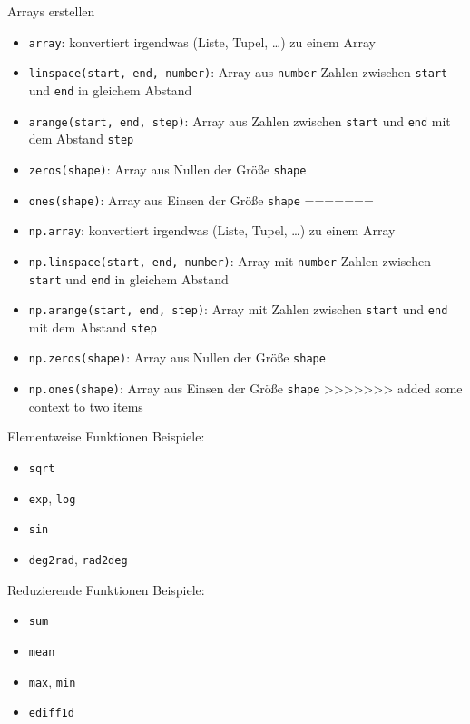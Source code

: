 \begin{frame}{Arrays erstellen}
  \begin{itemize}
    \item \texttt{array}: konvertiert irgendwas (Liste, Tupel, …) zu einem Array
    \item \texttt{linspace(start, end, number)}: Array aus \texttt{number} Zahlen zwischen \texttt{start} und \texttt{end} in gleichem Abstand
    \item \texttt{arange(start, end, step)}: Array aus Zahlen zwischen \texttt{start} und \texttt{end} mit dem Abstand \texttt{step}
    \item \texttt{zeros(shape)}: Array aus Nullen der Größe \texttt{shape}
    \item \texttt{ones(shape)}: Array aus Einsen der Größe \texttt{shape}
=======
    \item \texttt{np.array}: konvertiert irgendwas (Liste, Tupel, …) zu einem Array
    \item \texttt{np.linspace(start, end, number)}: Array mit \texttt{number} Zahlen zwischen \texttt{start} und \texttt{end} in gleichem Abstand
    \item \texttt{np.arange(start, end, step)}: Array mit Zahlen zwischen \texttt{start} und \texttt{end} mit dem Abstand \texttt{step}
    \item \texttt{np.zeros(shape)}: Array aus Nullen der Größe \texttt{shape}
    \item \texttt{np.ones(shape)}: Array aus Einsen der Größe \texttt{shape}
>>>>>>> added some context to two items
  \end{itemize}
\end{frame}

\begin{frame}{Elementweise Funktionen}
  Beispiele:
  \begin{itemize}
    \item \texttt{sqrt}
    \item \texttt{exp}, \texttt{log}
    \item \texttt{sin}
    \item \texttt{deg2rad}, \texttt{rad2deg}
  \end{itemize}
\end{frame}

\begin{frame}{Reduzierende Funktionen}
  Beispiele:
  \begin{itemize}
    \item \texttt{sum}
    \item \texttt{mean}
    \item \texttt{max}, \texttt{min}
    \item \texttt{ediff1d}
  \end{itemize}
\end{frame}

